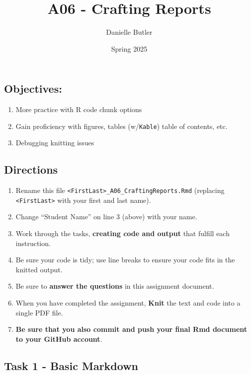 \documentclass[
]{article}
\title{A06 - Crafting Reports}
\author{Danielle Butler}
\date{Spring 2025}
\providecommand{\tightlist}{%
  \setlength{\itemsep}{0pt}\setlength{\parskip}{0pt}}
\begin{document}
\maketitle

{
\setcounter{tocdepth}{2}
\tableofcontents
}
\subsection{Objectives:}\label{objectives}

\begin{enumerate}
\def\labelenumi{\arabic{enumi}.}
\tightlist
\item
  More practice with R code chunk options
\item
  Gain proficiency with figures, tables (w/\texttt{Kable}) table of
  contents, etc.
\item
  Debugging knitting issues
\end{enumerate}

\subsection{Directions}\label{directions}

\begin{enumerate}
\def\labelenumi{\arabic{enumi}.}
\tightlist
\item
  Rename this file
  \texttt{\textless{}FirstLast\textgreater{}\_A06\_CraftingReports.Rmd}
  (replacing \texttt{\textless{}FirstLast\textgreater{}} with your first
  and last name).
\item
  Change ``Student Name'' on line 3 (above) with your name.
\item
  Work through the tasks, \textbf{creating code and output} that fulfill
  each instruction.
\item
  Be sure your code is tidy; use line breaks to ensure your code fits in
  the knitted output.
\item
  Be sure to \textbf{answer the questions} in this assignment document.
\item
  When you have completed the assignment, \textbf{Knit} the text and
  code into a single PDF file.
\item
  \textbf{Be sure that you also commit and push your final Rmd document
  to your GitHub account}.
\end{enumerate}

\subsection{Task 1 - Basic Markdown}\label{task-1---basic-markdown}
\end{document}
